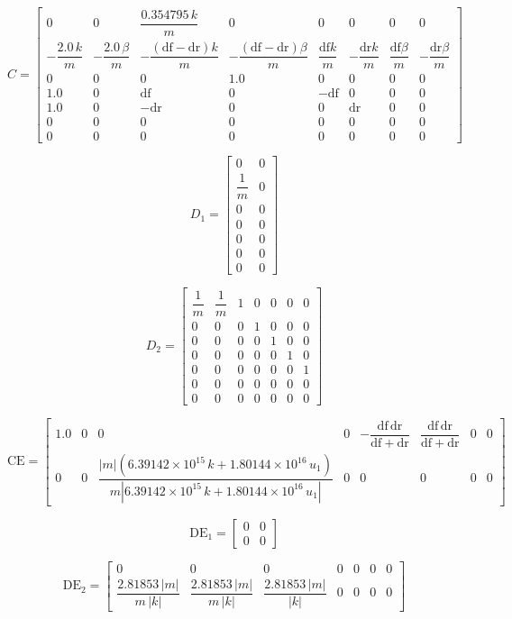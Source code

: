 \documentclass[]{report}
\begin{document}
\[
C =
\begin{bmatrix}
	0 & 0 & \dfrac{0.354795\,k}{m} & 0 & 0 & 0 & 0 & 0 \\
	-\dfrac{2.0\,k}{m} & -\dfrac{2.0\,\beta}{m} & -\dfrac{(\mathrm{df} - \mathrm{dr})k}{m} & -\dfrac{(\mathrm{df} - \mathrm{dr})\beta}{m} & \dfrac{\mathrm{df}k}{m} & -\dfrac{\mathrm{dr}k}{m} & \dfrac{\mathrm{df}\beta}{m} & -\dfrac{\mathrm{dr}\beta}{m} \\
	0 & 0 & 0 & 1.0 & 0 & 0 & 0 & 0 \\
	1.0 & 0 & \mathrm{df} & 0 & -\mathrm{df} & 0 & 0 & 0 \\
	1.0 & 0 & -\mathrm{dr} & 0 & 0 & \mathrm{dr} & 0 & 0 \\
	0 & 0 & 0 & 0 & 0 & 0 & 0 & 0 \\
	0 & 0 & 0 & 0 & 0 & 0 & 0 & 0
\end{bmatrix}
\]

\[
D_1 =
\begin{bmatrix}
	0 & 0 \\
	\dfrac{1}{m} & 0 \\
	0 & 0 \\
	0 & 0 \\
	0 & 0 \\
	0 & 0 \\
	0 & 0
\end{bmatrix}
\]

\[
D_2 =
\begin{bmatrix}
	\dfrac{1}{m} & \dfrac{1}{m} & 1 & 0 & 0 & 0 & 0 \\
	0 & 0 & 0 & 1 & 0 & 0 & 0 \\
	0 & 0 & 0 & 0 & 1 & 0 & 0 \\
	0 & 0 & 0 & 0 & 0 & 1 & 0 \\
	0 & 0 & 0 & 0 & 0 & 0 & 1 \\
	0 & 0 & 0 & 0 & 0 & 0 & 0 \\
	0 & 0 & 0 & 0 & 0 & 0 & 0
\end{bmatrix}
\]

\[
\mathrm{CE} =
\begin{bmatrix}
	1.0 & 0 & 0 & 0 & -\dfrac{\mathrm{df}\,\mathrm{dr}}{\mathrm{df} + \mathrm{dr}} & \dfrac{\mathrm{df}\,\mathrm{dr}}{\mathrm{df} + \mathrm{dr}} & 0 & 0 \\
	0 & 0 & \dfrac{|\!m\!|\left(6.39142 \times 10^{15}\,k + 1.80144 \times 10^{16}\,u_1\right)}{m \left|6.39142 \times 10^{15}\,k + 1.80144 \times 10^{16}\,u_1\right|} & 0 & 0 & 0 & 0 & 0
\end{bmatrix}
\]

\[
\mathrm{DE}_1 =
\begin{bmatrix}
	0 & 0 \\
	0 & 0
\end{bmatrix}
\]

\[
\mathrm{DE}_2 =
\begin{bmatrix}
	0 & 0 & 0 & 0 & 0 & 0 & 0 \\
	\dfrac{2.81853\,|m|}{m\,|k|} & \dfrac{2.81853\,|m|}{m\,|k|} & \dfrac{2.81853\,|m|}{|k|} & 0 & 0 & 0 & 0
\end{bmatrix}
\]


	
\end{document}

